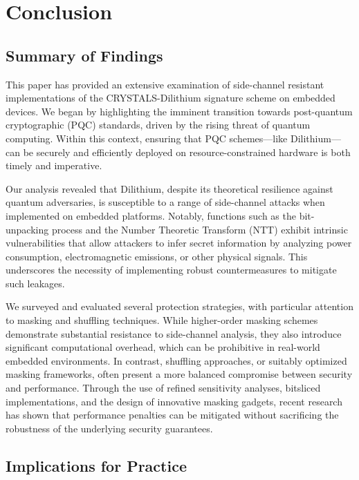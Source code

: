 \chapter{Conclusion}
\thispagestyle{chapterstart}

\section{Summary of Findings}

This paper has provided an extensive examination of side-channel resistant implementations of the CRYSTALS-Dilithium signature scheme on embedded devices. We began by highlighting the imminent transition towards post-quantum cryptographic (PQC) standards, driven by the rising threat of quantum computing. Within this context, ensuring that PQC schemes—like Dilithium—can be securely and efficiently deployed on resource-constrained hardware is both timely and imperative.

Our analysis revealed that Dilithium, despite its theoretical resilience against quantum adversaries, is susceptible to a range of side-channel attacks when implemented on embedded platforms. Notably, functions such as the bit-unpacking process and the Number Theoretic Transform (NTT) exhibit intrinsic vulnerabilities that allow attackers to infer secret information by analyzing power consumption, electromagnetic emissions, or other physical signals. This underscores the necessity of implementing robust countermeasures to mitigate such leakages.

We surveyed and evaluated several protection strategies, with particular attention to masking and shuffling techniques. While higher-order masking schemes demonstrate substantial resistance to side-channel analysis, they also introduce significant computational overhead, which can be prohibitive in real-world embedded environments. In contrast, shuffling approaches, or suitably optimized masking frameworks, often present a more balanced compromise between security and performance. Through the use of refined sensitivity analyses, bitsliced implementations, and the design of innovative masking gadgets, recent research has shown that performance penalties can be mitigated without sacrificing the robustness of the underlying security guarantees.

\section{Implications for Practice}

